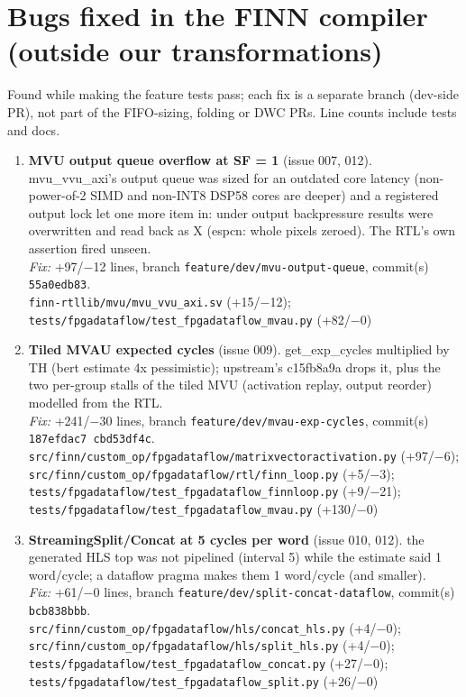 \documentclass[a4paper,10pt]{article}
\begin{document}
\clearpage\section*{Bugs fixed in the FINN compiler (outside our transformations)}
Found while making the feature tests pass; each fix is a separate branch (dev-side PR), not part of the FIFO-sizing, folding or DWC PRs. Line counts include tests and docs.
\begin{enumerate}
\item \textbf{MVU output queue overflow at SF = 1} (issue 007, 012). mvu\_vvu\_axi's output queue was sized for an outdated core latency (non-power-of-2 SIMD and non-INT8 DSP58 cores are deeper) and a registered output lock let one more item in: under output backpressure results were overwritten and read back as X (espcn: whole pixels zeroed). The RTL's own assertion fired unseen.\\
\emph{Fix:} +97/$-$12 lines, branch \texttt{feature/dev/mvu-output-queue}, commit(s) \texttt{55a0edb83}.\\
{\footnotesize \texttt{finn-rtllib/mvu/mvu\_vvu\_axi.sv} (+15/$-$12); \texttt{tests/fpgadataflow/test\_fpgadataflow\_mvau.py} (+82/$-$0)}
\item \textbf{Tiled MVAU expected cycles} (issue 009). get\_exp\_cycles multiplied by TH (bert estimate 4x pessimistic); upstream's c15fb8a9a drops it, plus the two per-group stalls of the tiled MVU (activation replay, output reorder) modelled from the RTL.\\
\emph{Fix:} +241/$-$30 lines, branch \texttt{feature/dev/mvau-exp-cycles}, commit(s) \texttt{187efdac7 cbd53df4c}.\\
{\footnotesize \texttt{src/finn/custom\_op/fpgadataflow/matrixvectoractivation.py} (+97/$-$6); \texttt{src/finn/custom\_op/fpgadataflow/rtl/finn\_loop.py} (+5/$-$3); \texttt{tests/fpgadataflow/test\_fpgadataflow\_finnloop.py} (+9/$-$21); \texttt{tests/fpgadataflow/test\_fpgadataflow\_mvau.py} (+130/$-$0)}
\item \textbf{StreamingSplit/Concat at 5 cycles per word} (issue 010, 012). the generated HLS top was not pipelined (interval 5) while the estimate said 1 word/cycle; a dataflow pragma makes them 1 word/cycle (and smaller).\\
\emph{Fix:} +61/$-$0 lines, branch \texttt{feature/dev/split-concat-dataflow}, commit(s) \texttt{bcb838bbb}.\\
{\footnotesize \texttt{src/finn/custom\_op/fpgadataflow/hls/concat\_hls.py} (+4/$-$0); \texttt{src/finn/custom\_op/fpgadataflow/hls/split\_hls.py} (+4/$-$0); \texttt{tests/fpgadataflow/test\_fpgadataflow\_concat.py} (+27/$-$0); \texttt{tests/fpgadataflow/test\_fpgadataflow\_split.py} (+26/$-$0)}

\end{enumerate}
\end{document}
